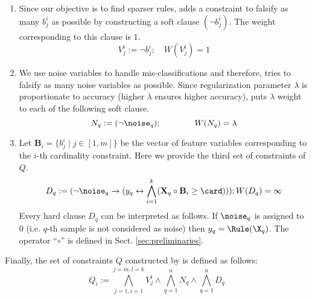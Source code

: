  	
	\begin{enumerate}
		
		\item Since our objective is to find sparser rules,  {\Framework}  adds a constraint to falsify as many $ b_j^i $  as possible by constructing a soft clause $ (\neg b_j^i) $.   The weight  corresponding to this clause is $ 1 $. 
	\begin{equation}
	V^i_j:= 
	\neg b^i_j
	;\quad  W(V^i_j)= 1
	\label{eq:constraint-v}
	\end{equation}
		\item We use noise variables to handle mis-classifications and therefore, {\Framework} tries to falsify as many   noise variables as possible. Since regularization parameter $ \lambda $ is proportionate to accuracy (higher $ \lambda $ ensures higher accuracy), {\Framework} puts $ \lambda $ weight to each of the following soft  clause. 
		\begin{equation}
		N_q:= (\neg \noise_q ); \qquad \qquad W(N_q) = \lambda
		\label{eq:constraint_two}
		\end{equation}
		
		\item 
		Let $\mathbf{B}_i = \{b^i_{j} \mid j \in [1,m] \}$ be the vector of feature variables corresponding to the $ i $-th cardinality constraint. 
		Here we provide the third set of constraints of $ Q $. 
		\begin{equation}
		D_q:= (\neg \noise_q \rightarrow ( y_q \leftrightarrow \bigwedge_{i=1}^{k} ({\mathbf{X}_q} \circ {\mathbf{B}_i \ge \card })));    W(D_q) = \infty
		\label{eq:constraint_three}	
		\end{equation}
		Every hard clause $D_q$  can be interpreted as follows. If $\noise_q$ is assigned to $ 0 $ (i.e. $ q $-th sample is not considered as noise) then ${y}_q = \Rule(\X_q) $.  The operator ``$\circ $'' is defined in Sect. \ref{sec:preliminaries}.  
		
		
		
	\end{enumerate}
	Finally, the set of constraints $Q$  constructed by {{\Framework}} is defined as follows:
	\begin{equation*}
	\label{eq:constraint-imli}
	Q_i :=  \bigwedge_{j=1, i = 1}^{j=m,l=k} V^i_j \wedge \bigwedge_{q=1}^{n} N_q \wedge \bigwedge_{q=1}^{n} D_q
	\end{equation*} 
	
